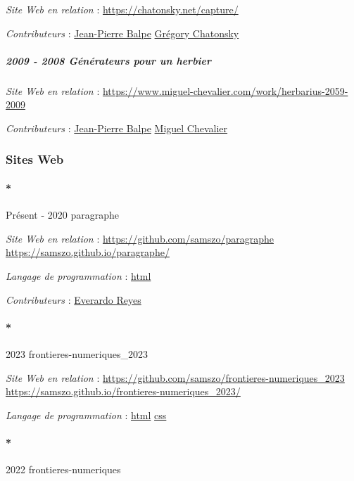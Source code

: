 \documentclass[
  a4paper,
  DIV=11,
  numbers=noendperiod]{scrreprt}
\let\oldparagraph\paragraph
\renewcommand{\paragraph}[1]{\oldparagraph{#1}\mbox{}}
\let\oldsubparagraph\subparagraph
\renewcommand{\subparagraph}[1]{\oldsubparagraph{#1}\mbox{}}
\begin{document}
\emph{Site Web en relation} : \url{https://chatonsky.net/capture/}

\emph{Contributeurs} :
\href{http://localhost/samszo/omk/s/fiches/item/61153}{Jean-Pierre
Balpe} \href{http://localhost/samszo/omk/s/fiches/item/301896}{Grégory
Chatonsky}

\subparagraph{2009 - 2008 Générateurs pour un
herbier}\label{sec-item301735}

\emph{Site Web en relation} :
\url{https://www.miguel-chevalier.com/work/herbarius-2059-2009}

\emph{Contributeurs} :
\href{http://localhost/samszo/omk/s/fiches/item/61153}{Jean-Pierre
Balpe} \href{http://localhost/samszo/omk/s/fiches/item/301898}{Miguel
Chevalier}

\subsubsection{Sites Web}\label{sites-web}

\paragraph*{Présent - 2020
paragraphe}\label{pruxe9sent---2020-paragraphe}

\emph{Site Web en relation} : \url{https://github.com/samszo/paragraphe}
\url{https://samszo.github.io/paragraphe/}

\emph{Langage de programmation} :
\href{http://localhost/samszo/omk/s/fiches/item/96621}{html}

\emph{Contributeurs} :
\href{http://localhost/samszo/omk/s/fiches/item/62572}{Everardo Reyes}

\paragraph*{2023 frontieres-numeriques\_2023}\label{sec-item301881}

\emph{Site Web en relation} :
\url{https://github.com/samszo/frontieres-numeriques_2023}
\url{https://samszo.github.io/frontieres-numeriques_2023/}

\emph{Langage de programmation} :
\href{http://localhost/samszo/omk/s/fiches/item/96621}{html}
\href{http://localhost/samszo/omk/s/fiches/item/102418}{css}

\paragraph*{2022 frontieres-numeriques}\label{sec-item301879}
\end{document}
